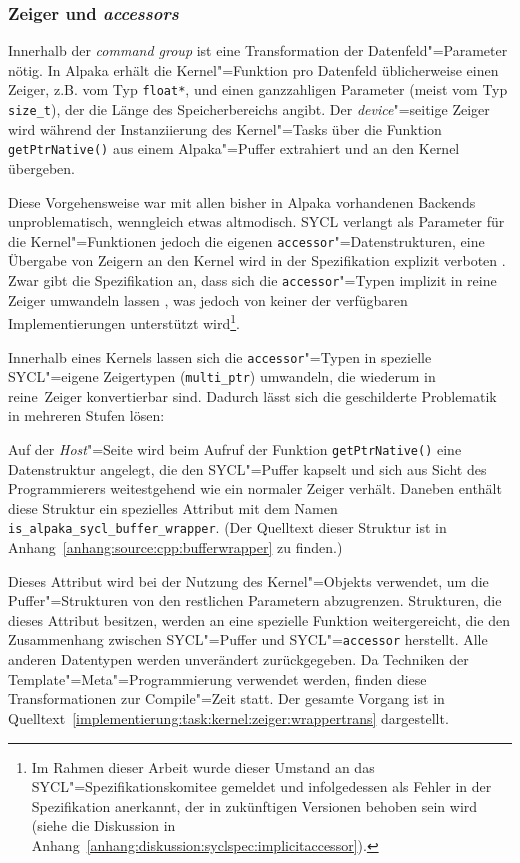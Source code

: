 \subsubsection{Zeiger und \textit{accessors}}

Innerhalb der \textit{command group} ist eine Transformation der
Datenfeld"=Parameter nötig. In Alpaka erhält die Kernel"=Funktion pro Datenfeld
üblicherweise einen Zeiger, z.B. vom Typ \texttt{float*}, und einen ganzzahligen
Parameter (meist vom Typ \texttt{size\_t}), der die Länge des Speicherbereichs
angibt. Der \textit{device}"=seitige Zeiger wird während der Instanziierung des
Kernel"=Tasks über die Funktion \texttt{getPtrNative()} aus einem Alpaka"=Puffer
extrahiert und an den Kernel übergeben.

Diese Vorgehensweise war mit allen bisher in Alpaka vorhandenen Backends
unproblematisch, wenngleich etwas altmodisch. SYCL verlangt als Parameter für
die Kernel"=Funktionen jedoch die eigenen \texttt{accessor}"=Datenstrukturen,
eine Übergabe von Zeigern an den Kernel wird in der Spezifikation explizit
verboten \cite[vgl.][192]{sycl2019}. Zwar gibt die Spezifikation an, dass sich
die \texttt{accessor}"=Typen implizit in reine Zeiger umwandeln lassen
\cite[vgl.][27]{sycl2019}, was jedoch von keiner der verfügbaren
Implementierungen unterstützt wird\footnote{Im Rahmen dieser Arbeit wurde dieser
Umstand an das SYCL"=Spezifikationskomitee gemeldet und infolgedessen als Fehler
in der Spezifikation anerkannt, der in zukünftigen Versionen behoben sein wird
(siehe die Diskussion in
Anhang~\ref{anhang:diskussion:syclspec:implicitaccessor}).}.

Innerhalb eines Kernels lassen sich die \texttt{accessor}"=Typen in spezielle
SYCL"=eigene Zeigertypen (\texttt{multi\_ptr}) umwandeln, die wiederum in
\glqq reine\grqq\ Zeiger konvertierbar sind. Dadurch lässt sich die geschilderte
Problematik in mehreren Stufen lösen:

Auf der \textit{Host}"=Seite wird beim Aufruf der Funktion
\texttt{getPtrNative()} eine Datenstruktur angelegt, die den SYCL"=Puffer
kapselt und sich aus Sicht des Programmierers weitestgehend wie ein normaler
Zeiger verhält. Daneben enthält diese Struktur ein spezielles Attribut mit dem
Namen \texttt{is\_alpaka\_sycl\_buffer\_wrapper}. (Der Quelltext dieser Struktur
ist in Anhang~\ref{anhang:source:cpp:bufferwrapper} zu finden.)

Dieses Attribut wird bei der Nutzung des Kernel"=Objekts verwendet, um die
Puffer"=Strukturen von den restlichen Parametern abzugrenzen. Strukturen, die
dieses Attribut besitzen, werden an eine spezielle Funktion weitergereicht, die
den Zusammenhang zwischen SYCL"=Puffer und SYCL"=\texttt{accessor} herstellt.
Alle anderen Datentypen werden unverändert zurückgegeben. Da Techniken der
Template"=Meta"=Programmierung verwendet werden, finden diese Transformationen
zur Compile"=Zeit statt. Der gesamte Vorgang ist in
Quelltext~\ref{implementierung:task:kernel:zeiger:wrappertrans} dargestellt.

